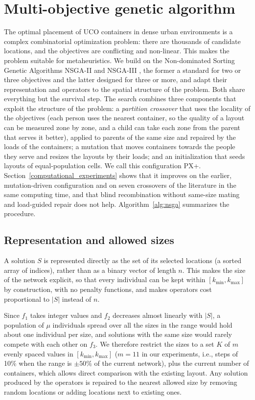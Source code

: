 \section{Multi-objective genetic algorithm}
\label{ga_algorithm}
The optimal placement of UCO containers in dense urban environments is a complex combinatorial optimization problem: there are thousands of candidate locations, and the objectives are conflicting and non-linear. This makes the problem suitable for metaheuristics. We build on the Non-dominated Sorting Genetic Algorithms NSGA-II \cite{deb2002fast} and NSGA-III \cite{deb2013evolutionary,jain2013evolutionary}, the former a standard for two or three objectives and the latter designed for three or more, and adapt their representation and operators to the spatial structure of the problem. Both share everything but the survival step. The search combines three components that exploit the structure of the problem: a \emph{partition crossover} that uses the locality of the objectives (each person uses the nearest container, so the quality of a layout can be measured zone by zone, and a child can take each zone from the parent that serves it better), applied to parents of the same size and repaired by the loads of the containers; a mutation that moves containers towards the people they serve and resizes the layouts by their loads; and an initialization that seeds layouts of equal-population cells. We call this configuration PX+. Section~\ref{computational_experiments} shows that it improves on the earlier, mutation-driven configuration and on seven crossovers of the literature in the same computing time, and that blind recombination without same-size mating and load-guided repair does not help. Algorithm~\ref{alg:nsga} summarizes the procedure.

\subsection{Representation and allowed sizes}
A solution $S$ is represented directly as the set of its selected locations (a sorted array of indices), rather than as a binary vector of length $n$. This makes the size of the network explicit, so that every individual can be kept within $[k_{\min}, k_{\max}]$ by construction, with no penalty functions, and makes operators cost proportional to $|S|$ instead of $n$.

Since $f_1$ takes integer values and $f_2$ decreases almost linearly with $|S|$, a population of $\mu$ individuals spread over all the sizes in the range would hold about one individual per size, and solutions with the same size would rarely compete with each other on $f_3$. We therefore restrict the sizes to a set $K$ of $m$ evenly spaced values in $[k_{\min}, k_{\max}]$ ($m = 11$ in our experiments, i.e., steps of 10\% when the range is $\pm 50\%$ of the current network), plus the current number of containers, which allows direct comparison with the existing layout. Any solution produced by the operators is repaired to the nearest allowed size by removing random locations or adding locations next to existing ones.

